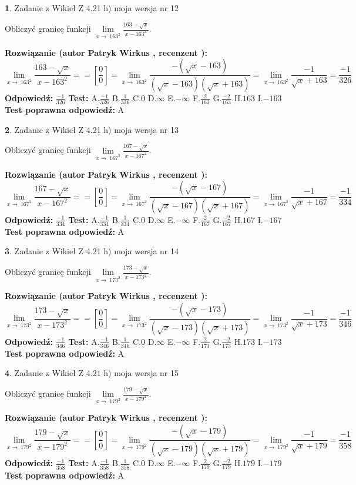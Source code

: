 \documentclass[12pt, a4paper]{article}
\theoremstyle{definition} %
\newtheorem{zad}{}
\newcommand{\zadStart}[1]{\begin{zad}#1\newline}
\newcommand{\zadStop}{\end{zad}}
\newcommand{\rozwStart}[2]{\noindent \textbf{Rozwiązanie (autor #1 , recenzent #2): }\newline}
\newcommand{\rozwStop}{\newline}
\newcommand{\odpStart}{\noindent \textbf{Odpowiedź:}\newline}
\newcommand{\odpStop}{\newline}
\newcommand{\testStart}{\noindent \textbf{Test:}\newline}
\newcommand{\testStop}{\newline}
\newcommand{\kluczStart}{\noindent \textbf{Test poprawna odpowiedź:}\newline}
\newcommand{\kluczStop}{\newline}
\begin{document}
\zadStart{Zadanie z Wikieł Z 4.21 h) moja wersja nr 12}

Obliczyć granicę funkcji $\lim\limits_{x\to\ 163^{2}}\frac{163-\sqrt{x}}{x-163^{2}}$.
\zadStop
\rozwStart{Patryk Wirkus}{}
$$\lim\limits_{x\to\ 163^{2}}\frac{163-\sqrt{x}}{x-163^{2}} = = [\frac{0}{0}] = \lim\limits_{x\to\ 163^{2}}\frac{-(\sqrt{x}-163)}{(\sqrt{x}-163)(\sqrt{x}+163)} = \lim\limits_{x\to\ 163^{2}}\frac{-1}{\sqrt{x}+163} = \frac{-1}{326}$$
\rozwStop
\odpStart
$\frac{-1}{326}$
\odpStop
\testStart
A.$\frac{-1}{326}$ B.$\frac{1}{326}$ C.$0$ D.$\infty$ E.$-\infty$
F.$\frac{2}{163}$ G.$\frac{-2}{163}$
H.$163$
I.$-163$
\testStop
\kluczStart
A
\kluczStop



\zadStart{Zadanie z Wikieł Z 4.21 h) moja wersja nr 13}

Obliczyć granicę funkcji $\lim\limits_{x\to\ 167^{2}}\frac{167-\sqrt{x}}{x-167^{2}}$.
\zadStop
\rozwStart{Patryk Wirkus}{}
$$\lim\limits_{x\to\ 167^{2}}\frac{167-\sqrt{x}}{x-167^{2}} = = [\frac{0}{0}] = \lim\limits_{x\to\ 167^{2}}\frac{-(\sqrt{x}-167)}{(\sqrt{x}-167)(\sqrt{x}+167)} = \lim\limits_{x\to\ 167^{2}}\frac{-1}{\sqrt{x}+167} = \frac{-1}{334}$$
\rozwStop
\odpStart
$\frac{-1}{334}$
\odpStop
\testStart
A.$\frac{-1}{334}$ B.$\frac{1}{334}$ C.$0$ D.$\infty$ E.$-\infty$
F.$\frac{2}{167}$ G.$\frac{-2}{167}$
H.$167$
I.$-167$
\testStop
\kluczStart
A
\kluczStop



\zadStart{Zadanie z Wikieł Z 4.21 h) moja wersja nr 14}

Obliczyć granicę funkcji $\lim\limits_{x\to\ 173^{2}}\frac{173-\sqrt{x}}{x-173^{2}}$.
\zadStop
\rozwStart{Patryk Wirkus}{}
$$\lim\limits_{x\to\ 173^{2}}\frac{173-\sqrt{x}}{x-173^{2}} = = [\frac{0}{0}] = \lim\limits_{x\to\ 173^{2}}\frac{-(\sqrt{x}-173)}{(\sqrt{x}-173)(\sqrt{x}+173)} = \lim\limits_{x\to\ 173^{2}}\frac{-1}{\sqrt{x}+173} = \frac{-1}{346}$$
\rozwStop
\odpStart
$\frac{-1}{346}$
\odpStop
\testStart
A.$\frac{-1}{346}$ B.$\frac{1}{346}$ C.$0$ D.$\infty$ E.$-\infty$
F.$\frac{2}{173}$ G.$\frac{-2}{173}$
H.$173$
I.$-173$
\testStop
\kluczStart
A
\kluczStop



\zadStart{Zadanie z Wikieł Z 4.21 h) moja wersja nr 15}

Obliczyć granicę funkcji $\lim\limits_{x\to\ 179^{2}}\frac{179-\sqrt{x}}{x-179^{2}}$.
\zadStop
\rozwStart{Patryk Wirkus}{}
$$\lim\limits_{x\to\ 179^{2}}\frac{179-\sqrt{x}}{x-179^{2}} = = [\frac{0}{0}] = \lim\limits_{x\to\ 179^{2}}\frac{-(\sqrt{x}-179)}{(\sqrt{x}-179)(\sqrt{x}+179)} = \lim\limits_{x\to\ 179^{2}}\frac{-1}{\sqrt{x}+179} = \frac{-1}{358}$$
\rozwStop
\odpStart
$\frac{-1}{358}$
\odpStop
\testStart
A.$\frac{-1}{358}$ B.$\frac{1}{358}$ C.$0$ D.$\infty$ E.$-\infty$
F.$\frac{2}{179}$ G.$\frac{-2}{179}$
H.$179$
I.$-179$
\testStop
\kluczStart
A
\kluczStop
\end{document}
